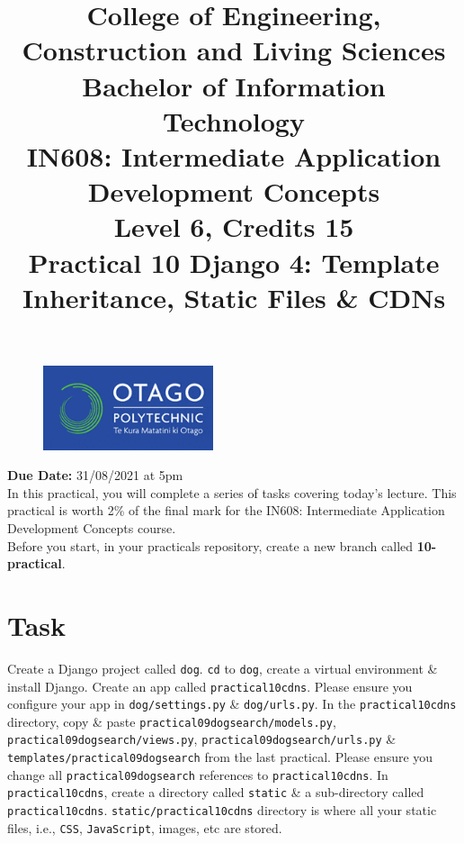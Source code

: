 \documentclass{article}
\author{}
\begin{document}
\begin{figure}
	\centering
	\includegraphics[width=50mm]{./img/logo.png}
\end{figure}

\title{College of Engineering, Construction and Living Sciences\\Bachelor of Information Technology\\IN608: Intermediate Application Development Concepts\\Level 6, Credits 15\\\textbf{Practical 10 Django 4: Template Inheritance, Static Files \& CDNs}} 
\date{}
\maketitle

\textbf{Due Date:} 31/08/2021 at 5pm \\

In this practical, you will complete a series of tasks covering today's lecture. This practical is worth 2\% of the final mark for the IN608: Intermediate Application Development Concepts course. \\

Before you start, in your practicals repository, create a new branch called \textbf{10-practical}.

\section*{Task} 
Create a Django project called \texttt{dog}. \texttt{cd} to \texttt{dog}, create a virtual environment \& install Django. Create an app called \texttt{practical10cdns}. Please ensure you configure your app in \texttt{dog/settings.py} \& \texttt{dog/urls.py}. In the \texttt{practical10cdns} directory, copy \& paste \texttt{practical09dogsearch/models.py}, \texttt{practical09dogsearch/views.py}, \texttt{practical09dogsearch/urls.py} \& \texttt{templates/practical09dogsearch} from the last practical. Please ensure you change all \texttt{practical09dogsearch} references to \texttt{practical10cdns}. In \texttt{practical10cdns}, create a directory called \texttt{static} \& a sub-directory called  \texttt{practical10cdns}. \texttt{static/practical10cdns} directory is where all your static files, i.e., \texttt{CSS}, \texttt{JavaScript}, images, etc are stored. \\
\end{document}
